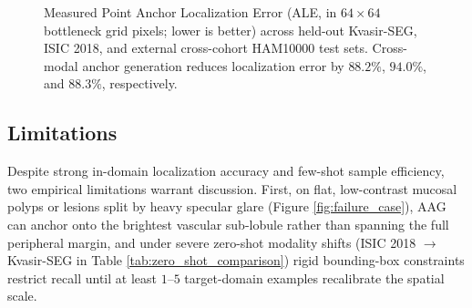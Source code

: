 \documentclass[onecolumn]{IEEEtran}
\numberwithin{equation}{section}
\theoremstyle{definition}
\theoremstyle{remark}
\begin{document}
\begin{figure}[!htbp]
\centering
{}
\caption{Measured Point Anchor Localization Error (ALE, in $64 \times 64$ bottleneck grid pixels; lower is better) across held-out Kvasir-SEG, ISIC 2018, and external cross-cohort HAM10000 test sets. Cross-modal anchor generation reduces localization error by $88.2\%$, $94.0\%$, and $88.3\%$, respectively.}
\label{fig:ale_comparison}
\end{figure}

\subsection{Limitations}

Despite strong in-domain localization accuracy and few-shot sample efficiency, two empirical limitations warrant discussion. First, on flat, low-contrast mucosal polyps or lesions split by heavy specular glare (Figure \ref{fig:failure_case}), AAG can anchor onto the brightest vascular sub-lobule rather than spanning the full peripheral margin, and under severe zero-shot modality shifts (ISIC 2018 $\rightarrow$ Kvasir-SEG in Table \ref{tab:zero_shot_comparison}) rigid bounding-box constraints restrict recall until at least $1$--$5$ target-domain examples recalibrate the spatial scale.
\end{document}
